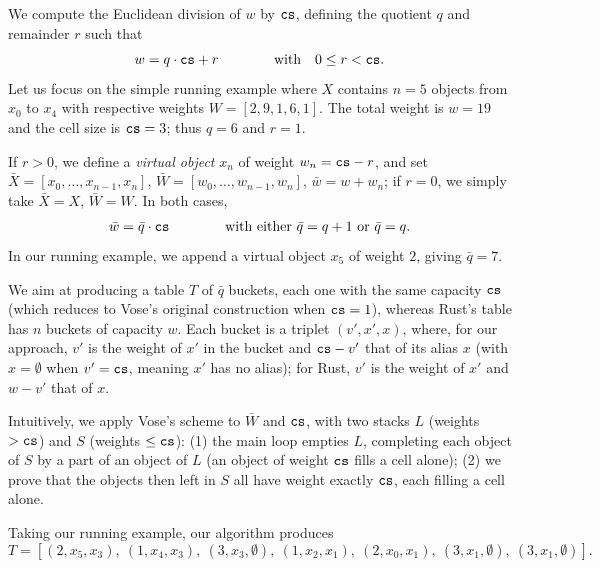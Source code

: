 We compute the Euclidean division of $w$ by $\texttt{cs}$, defining the quotient $q$ and remainder $r$ such that
\begin{equation}
    \label{eq:division}
    w = q \cdot \texttt{cs} + r \qquad\qquad \text{with} \quad 0 \leq r < \texttt{cs}.
\end{equation}
Let us focus on the simple running example where $X$ contains $n=5$ objects from $x_0$ to $x_4$
with respective weights $W = [2, 9, 1, 6, 1]$. The total weight is $w = 19$ and the cell size is $\texttt{cs} = 3$;
thus $q = 6$ and $r=1$.

If $r > 0$, we define a \emph{virtual object} $x_n$ of weight $w_n = \texttt{cs} - r$, and set
$\bar{X} = [x_0, \dots, x_{n-1}, x_n]$, $\bar{W} =[w_0, \dots, w_{n-1}, w_n]$, $\bar{w} = w + w_n$;
if $r=0$, we simply take $\bar{X} = X$, $\bar{W} = W$. In both cases,
\begin{equation}
    \label{eq:division2}
    \bar{w} = \bar{q} \cdot \texttt{cs} \qquad\qquad \text{with either } \bar{q}=q+1 \text{ or } \bar{q}=q.
\end{equation}
In our running example, we append a virtual object $x_5$ of weight $2$, giving $\bar{q} = 7$.

We aim at producing a table $T$ of $\bar{q}$ buckets, each one with the same capacity $\texttt{cs}$
(which reduces to Vose's original construction when $\texttt{cs}=1$), whereas Rust's table has $n$ buckets of
capacity $w$. Each bucket is a triplet
$(v', x', x)$, where, for our approach, $v'$ is the weight of $x'$ in the bucket and $\texttt{cs} - v'$ that of its
alias $x$ (with $x=\emptyset$ when $v'=\texttt{cs}$, meaning $x'$ has no alias); for Rust, $v'$ is the weight of $x'$
and $w - v'$ that of $x$.

Intuitively, we apply Vose's scheme to $\bar{W}$ and $\texttt{cs}$, with two stacks $L$ (weights $>\texttt{cs}$) and $S$
(weights $\leq\texttt{cs}$): (1) the main loop empties $L$, completing each object of $S$ by a part of an object
of $L$ (an object of weight $\texttt{cs}$ fills a cell alone); (2) we prove that the objects then left in $S$ all
have weight exactly $\texttt{cs}$, each filling a cell alone.

Taking our running example, our algorithm produces
\[
    T = [(2, x_5, x_3),\ (1, x_4, x_3),\ (3, x_3, \emptyset),\ (1, x_2, x_1),\ (2, x_0, x_1),\ (3, x_1, \emptyset),\ (3, x_1, \emptyset)].
\]

